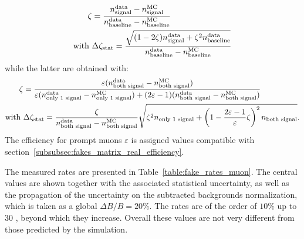 \begin{align}
\zeta&=\frac{n_\text{signal}^\text{data} - n_\text{signal}^\text{MC}}{n_\text{baseline}^\text{data} - n_\text{baseline}^\text{MC}}\\
\text{with }&\Delta\zeta_\text{stat} = \frac{\sqrt{(1-2\zeta)n_\text{signal}^\text{data} + \zeta^2 n_\text{baseline}^\text{data}}}
{n_\text{baseline}^\text{data} - n_\text{baseline}^\text{MC}}\notag
\end{align}
while the latter are obtained with:
\begin{align}
\zeta &= \frac{\varepsilon (n_\text{both signal}^\text{data} - n_\text{both signal}^\text{MC})}
{\varepsilon (n_\text{only 1 signal}^\text{data} - n_\text{only 1 signal}^\text{MC})
+(2\varepsilon-1)(n_\text{both signal}^\text{data} - n_\text{both signal}^\text{MC})}\\
\text{with }&\Delta\zeta_\text{stat} 
= \frac{\zeta}{n_\text{both signal}^\text{data} - n_\text{both signal}^\text{MC}}
\sqrt{\zeta^2 n_\text{only 1 signal} + \left(1-\frac{2\varepsilon-1}{\varepsilon}\zeta\right)^2 n_\text{both signal}}.\notag
\end{align}
The efficiency for prompt muons $\varepsilon$ is assigned values compatible with section~\ref{subsubsec:fakes_matrix_real_efficiency}. 

The measured rates are presented in Table~\ref{table:fake_rates_muon}. 
The central values are shown together with the associated statistical uncertainty, 
as well as the propagation of the uncertainty on the subtracted backgrounds normalization, 
which is taken as a global $\Delta B/B=20\%$. 
The rates are of the order of $10\%$ up to 30 \GeV, beyond which they increase. 
Overall these values are not very different from those predicted by the simulation. 


